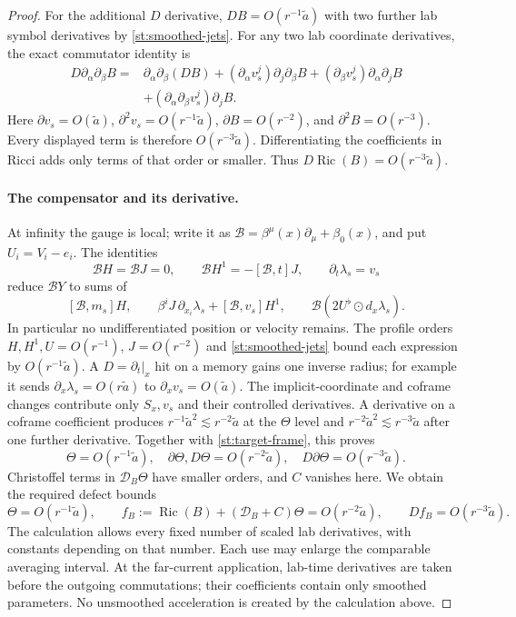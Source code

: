 \begin{proof}
For the additional \(D\) derivative, \(DB=O(r^{-1}\widetilde a)\) with two further lab symbol derivatives by \eqref{st:smoothed-jets}. For any two lab coordinate derivatives, the exact commutator identity is
\[
\begin{split}
 D\partial_\alpha\partial_\beta B
 ={}&\partial_\alpha\partial_\beta(DB)
 +(\partial_\alpha v_s^j)\partial_j\partial_\beta B
 +(\partial_\beta v_s^j)\partial_\alpha\partial_j B\\
 &+(\partial_\alpha\partial_\beta v_s^j)\partial_jB.
\end{split}
\]
Here \(\partial v_s=O(\widetilde a)\), \(\partial^2v_s=O(r^{-1}\widetilde a)\), \(\partial B=O(r^{-2})\), and \(\partial^2B=O(r^{-3})\). Every displayed term is therefore \(O(r^{-3}\widetilde a)\). Differentiating the coefficients in Ricci adds only terms of that order or smaller. Thus \(D\operatorname{Ric}(B)=O(r^{-3}\widetilde a)\).

\paragraph{The compensator and its derivative.}
At infinity the gauge is local; write it as
\(\mathcal B=\beta^\mu(x)\partial_\mu+\beta_0(x)\), and put \(U_i=V_i-e_i\). The identities
\[
 \mathcal BH=\mathcal BJ=0,\qquad
 \mathcal BH^1=-[\mathcal B,t]J,\qquad
 \partial_t\lambda_s=v_s
\]
reduce \(\mathcal BY\) to sums of
\[
 [\mathcal B,m_s]H,\qquad
 \beta^iJ\,\partial_{x_i}\lambda_s+[\mathcal B,v_s]H^1,
 \qquad
 \mathcal B(2U^\flat\odot d_x\lambda_s).
\]
In particular no undifferentiated position or velocity remains. The profile orders
\(H,H^1,U=O(r^{-1})\), \(J=O(r^{-2})\) and
\eqref{st:smoothed-jets} bound each expression by
\(O(r^{-1}\widetilde a)\). A \(D=\partial_t|_x\) hit on a memory gains one inverse radius; for example it sends
\(\partial_x\lambda_s=O(r\widetilde a)\) to
\(\partial_xv_s=O(\widetilde a)\). The implicit-coordinate and coframe changes contribute only \(S_x,v_s\) and their controlled derivatives. A derivative on a coframe coefficient produces
\(r^{-1}\widetilde a^2\lesssim r^{-2}\widetilde a\) at the \(\Theta\) level and
\(r^{-2}\widetilde a^2\lesssim r^{-3}\widetilde a\) after one further derivative. Together with \eqref{st:target-frame}, this proves
\[
 \Theta=O(r^{-1}\widetilde a),\quad
 \partial\Theta,D\Theta=O(r^{-2}\widetilde a),\quad
 D\partial\Theta=O(r^{-3}\widetilde a).
\]
Christoffel terms in \(\mathcal D_B\Theta\) have smaller orders, and \(C\) vanishes here. We obtain the required defect bounds
\begin{equation}\label{st:full-defect-identity}
 \Theta=O(r^{-1}\widetilde a),\qquad
 f_B:=\operatorname{Ric}(B)+(\mathcal D_B+C)\Theta
       =O(r^{-2}\widetilde a),\qquad
 Df_B=O(r^{-3}\widetilde a).
\end{equation}
The calculation allows every fixed number of scaled lab derivatives, with constants depending on that number. Each use may enlarge the comparable averaging interval. At the far-current application, lab-time derivatives are taken before the outgoing commutations; their coefficients contain only smoothed parameters. No unsmoothed acceleration is created by the calculation above.


\end{proof}
